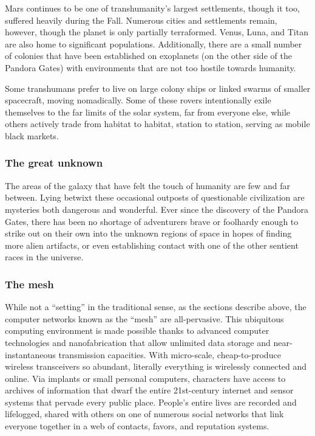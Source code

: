 Mars continues to be one of transhumanity's largest settlements, though it too, suffered heavily during the Fall. Numerous cities and settlements remain, however, though the planet is only partially terraformed. Venus, Luna, and Titan are also home to significant populations. Additionally, there are a small number of colonies that have been established on exoplanets (on the other side of the Pandora Gates) with environments that are not too hostile towards humanity. 

Some transhumans prefer to live on large colony ships or linked swarms of smaller spacecraft, moving nomadically. Some of these rovers intentionally exile themselves to the far limits of the solar system, far from everyone else, while others actively trade from habitat to habitat, station to station, serving as mobile black markets. 



\subsubsection{The great unknown} \label{sec:great-unknown} 

The areas of the galaxy that have felt the touch of humanity are few and far between. Lying betwixt these occasional outposts of questionable civilization are mysteries both dangerous and wonderful. Ever since the discovery of the Pandora Gates, there has been no shortage of adventurers brave or foolhardy enough to strike out on their own into the unknown regions of space in hopes of finding more alien artifacts, or even establishing contact with one of the other sentient races in the universe. 



\subsubsection{The mesh} \label{sec:mesh} 

While not a ``setting'' in the traditional sense, as the sections describe above, the computer networks known as the ``mesh'' are all-pervasive. This ubiquitous computing environment is made possible thanks to advanced computer technologies and nanofabrication that allow unlimited data storage and near-instantaneous transmission capacities. With micro-scale, cheap-to-produce wireless transceivers so abundant, literally everything is wirelessly connected and online. Via implants or small personal computers, characters have access to archives of information that dwarf the entire 21st-century internet and sensor systems that pervade every public place. People's entire lives are recorded and lifelogged, shared with others on one of numerous social networks that link everyone together in a web of contacts, favors, and reputation systems. 



